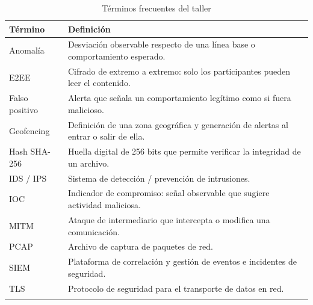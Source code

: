 \begin{table}[H]
	\caption{Términos frecuentes del taller}
	\label{tab:glosario}
	\centering
	\footnotesize
	\renewcommand{\arraystretch}{1.2}
	\begin{tabularx}{\textwidth}{@{}>{\raggedright\arraybackslash}p{} Y@{}}
		\toprule
		\textbf{Término} & \textbf{Definición} \\
		\midrule
		Anomalía & Desviación observable respecto de una línea base o comportamiento esperado. \\
		E2EE & Cifrado de extremo a extremo: solo los participantes pueden leer el contenido. \\
		Falso positivo & Alerta que señala un comportamiento legítimo como si fuera malicioso. \\
		Geofencing & Definición de una zona geográfica y generación de alertas al entrar o salir de ella. \\
		Hash SHA-256 & Huella digital de 256 bits que permite verificar la integridad de un archivo. \\
		IDS / IPS & Sistema de detección / prevención de intrusiones. \\
		IOC & Indicador de compromiso: señal observable que sugiere actividad maliciosa. \\
		MITM & Ataque de intermediario que intercepta o modifica una comunicación. \\
		PCAP & Archivo de captura de paquetes de red. \\
		SIEM & Plataforma de correlación y gestión de eventos e incidentes de seguridad. \\
		TLS & Protocolo de seguridad para el transporte de datos en red. \\
		& \\
		\bottomrule
	\end{tabularx}
\end{table}
